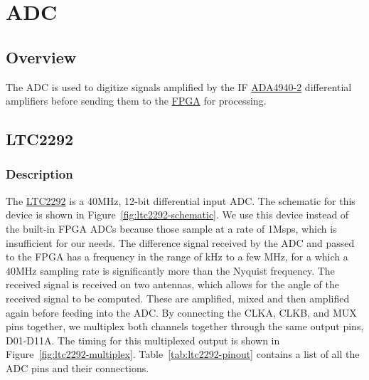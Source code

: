 \section{ADC}
\label{sec:adc}

\subsection{Overview}
\label{sec:adc-overview}

The ADC is used to digitize signals amplified by the IF \hyperref[sec:ada4940-2]{ADA4940-2}
differential amplifiers before sending them to the \hyperref[sec:xc7a15t-ftg256]{FPGA} for
processing.

\subsection{LTC2292}
\label{sec:ltc2292}

\subsubsection{Description}
\label{sec:ltc2292-description}

The \href{http://www.analog.com/media/en/technical-documentation/data-sheets/229321fa.pdf}{LTC2292}
is a 40MHz, 12-bit differential input ADC. The schematic for this device is shown in
Figure~\ref{fig:ltc2292-schematic}. We use this device instead of the built-in FPGA ADCs because
those sample at a rate of 1Msps, which is insufficient for our needs. The difference signal received
by the ADC and passed to the FPGA has a frequency in the range of kHz to a few MHz, for a which a
40MHz sampling rate is significantly more than the Nyquist frequency. The received signal is
received on two antennas, which allows for the angle of the received signal to be computed. These
are amplified, mixed and then amplified again before feeding into the ADC. By connecting the CLKA,
CLKB, and MUX pins together, we multiplex both channels together through the same output pins,
D01-D11A. The timing for this multiplexed output is shown in
Figure~\ref{fig:ltc2292-multiplex}. Table~\ref{tab:ltc2292-pinout} contains a list of all the ADC
pins and their connections.

